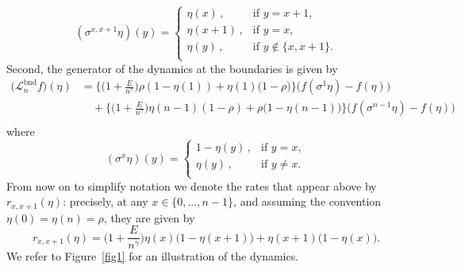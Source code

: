 \documentclass[10pt]{amsart}
\theoremstyle{definition}\newtheorem{defi}[theo]{Definition}\newtheorem{rema}[theo]{Remark}\newtheorem{exam}[theo]{Example}\newtheorem{exem}[theo]{Example}\newtheorem{nota}[theo]{Notation}
\newcommand{\mc}[1]{{\mathcal #1}}
\renewcommand{\mc}[1]{{\mathcal #1}}
\begin{document}
\[
(\sigma^{x,x+1} \eta)(y)=
\begin{cases}
\eta(x)\,,& \text{if } y=x+1,\\
\eta(x+1)\,,& \text{if } y=x,\\
\eta(y)\,,& \text{if } y\notin \{x,x+1\}.\\
\end{cases}
\]
Second, the generator of the dynamics at the boundaries is given by
\begin{equation*}
\begin{split}
\big(\mc L_n^{\mathrm{bnd}} f\big)(\eta) & =
\bigg\{\bigg(1+\frac{E}{n^\gamma} \bigg) \rho(1-\eta(1))+\eta(1)\big(1-\rho\big)\bigg\}\big(f(\sigma^{1}\eta) -f(\eta)\big)\\
&\quad +
\bigg\{\bigg(1+\frac{E}{n^\gamma} \bigg) \eta(n-1)(1-\rho)+\rho\big(1-\eta(n-1)\big)\bigg\}\big(f(\sigma^{n-1}\eta) -f(\eta)\big)\\
\end{split}
\end{equation*}
where
\[
(\sigma^{x} \eta)(y)=
\begin{cases}
1-\eta(y)\,,& \text{if } y=x,\\
\eta(y)\,,& \text{if } y\neq x.\\
\end{cases}
\]
From now on to simplify notation we denote the rates that appear above by $r_{x,x+1}(\eta)$: precisely, at any $x\in\{0,\dots,n-1\}$, and assuming the convention $\eta(0)=\eta(n)=\rho$, they are given by
\begin{equation}\label{eq:rate}
r_{x,x+1}(\eta)=\bigg(1+\frac{E}{n^\gamma} \bigg) \eta(x)\big(1-\eta(x+1)\big)+\eta(x+1)\big(1-\eta(x)\big).
\end{equation}
We refer to Figure~\ref{fig1} for an illustration of the dynamics.
\end{document}
